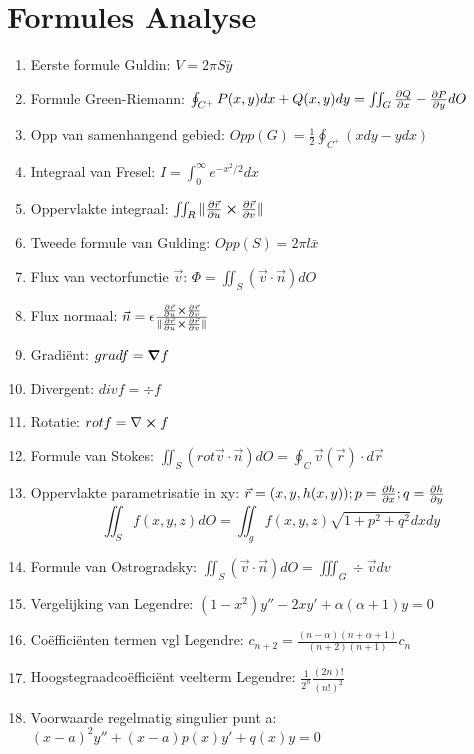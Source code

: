 \documentclass[12pt]{article}
\begin{document}
    \maketitle

    \section{Formules Analyse}
    \label{sec:formules_analyse}
   
    \begin{enumerate}
	    \item Eerste formule Guldin: $ V = 2\pi S \bar{y}$
	    \item Formule Green-Riemann: $ \oint_{C^+} P(x, y)dx + Q(x, y)dy = \iint_G \pdv{Q}{x} - \pdv{P}{y} dO $
	    \item Opp van samenhangend gebied: $ Opp(G) = \frac{1}{2} \oint_{C^+} {(xdy - ydx)}  $
	    \item Integraal van Fresel: $ I = \int_0^{\infty} e^{-x^2/2} dx$
    	    \item Oppervlakte integraal:  $ \iint_R \| \pdv{\vec{r}}{u} \cross \pdv{\vec{r}}{v} \| $
            \item Tweede formule van Gulding: $ Opp(S) = 2\pi l \bar{x}$
	    \item Flux van vectorfunctie $ \vec{v}$: $ \Phi = \iint_S (\vec{v} \cdot \vec{n}) dO$
	    \item Flux normaal: $\vec{n} = \epsilon \frac{\pdv{\vec{r}}{u} \cross \pdv{\vec{r}}{v}}{\| \pdv{\vec{r}}{u} \cross \pdv{\vec{r}}{v} \| }$
	    \item Gradi\"ent: $ grad f = \grad f$
	    \item Divergent: $ div f = \div f $
	    \item Rotatie: $ rot f = \nabla \cross f $
	    \item Formule van Stokes:  $ \iint_S (rot \vec{ v}\cdot \vec{n}) dO = \oint_C \vec{v}(\vec{r}) \cdot d \vec{r} $
	    \item Oppervlakte parametrisatie in xy: $ \vec{r} = (x, y, h(x,y)); p = \pdv{h}{x}; q = \pdv{h}{y} $ $$ \iint_S f(x,y,z) dO = \iint_g f(x,y,z) \sqrt{1+p^2+q^2} dxdy  $$
	    \item Formule van Ostrogradsky: $ \iint_S (\vec{v} \cdot \vec{n})dO = \iiint_G \div \vec{v} dv$
	    \item Vergelijking van Legendre: $ (1-x^2)y'' - 2xy' + \alpha(\alpha+1)y = 0 $
	    \item Co\"effici\"enten termen vgl Legendre:  $ c_{n+2} = \frac{(n-\alpha)(n+\alpha+1)}{(n+2)(n+1)}c_n $
	    \item Hoogstegraadco\"effici\"ent veelterm Legendre:  $ \frac{1}{2^n} \frac{(2n)!}{{(n!)}^2} $
	    \item Voorwaarde regelmatig singulier punt a: $ {(x-a)}^2y'' + (x-a)p(x)y' + q(x)y = 0 $
    \end{enumerate}
    
\end{document}
